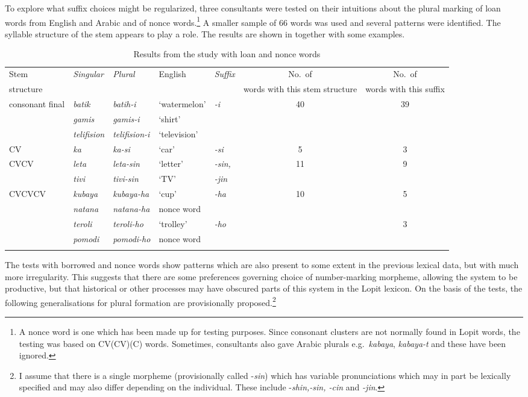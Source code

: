 \documentclass[output=paper]{langsci/langscibook}
\begin{document}
To explore what suffix choices might be regularized, three consultants were tested on their intuitions about the plural marking of loan words from English and Arabic and of nonce words.\footnote{A nonce word is one which has been made up for testing purposes. Since consonant clusters are not normally found in Lopit words, the testing was based on CV(CV)(C) words. Sometimes, consultants also gave Arabic plurals e.g.\ \textit{kabaya}, \textit{kabaya-t} and these have been ignored.} A smaller sample of 66 words was used and several patterns were identified. The syllable structure of the stem appears to play a role. The results are shown in  together with some examples.

\begin{table}
\begin{tabularx}{\textwidth}{X>{\itshape}l>{\itshape}lX>{\itshape}lSS}
\lsptoprule

\small {Stem} & \small \textup{Singular} & \small \textup{Plural} & \small {English} & \small \textup{Suffix} & \small {No.\ of}  & \small {No.\ of} \\ [-.15em]
\small {structure} & & & & & \small {words with this stem structure} & \small {words with this suffix} \\ 
\midrule
 consonant final &  batik &  batih-i &  `water\-melon' &  -i &  40 &  39\\
\tablevspace
&  gamis &  gamis-i &  ‘shirt’ &  &  & \\
\tablevspace
&  telifision &  telifision-i &  ‘television’ &  &  & \\
\midrule
 CV &  ka &  ka-si &  ‘car’ &  -si &  5 &  3\\
\midrule
 CVCV &  leta &  leta-sin &  ‘letter’ & { -sin,}
 &  11 &  9\\
\tablevspace
&  tivi &  tivi-sin &  ‘TV’ &   -jin &  & \\
\midrule
 CVCVCV &  kubaya &  kubaya-ha &  ‘cup’ &  -ha &  10 &  5\\
&  natana &  natana-ha &  nonce word &  &  & \\
\tablevspace
&  teroli &  teroli-ho &  ‘trolley’ &  -ho &  &  3\\
\tablevspace
&  pomodi &  pomodi-ho &  nonce word &  &  & \\
\lspbottomrule
\end{tabularx}
\caption{Results from the study with loan and nonce words}
\label{tab:moodie:13}
\end{table}

The tests with borrowed and nonce words show patterns which are also present to some extent in the previous lexical data, but with much more irregularity. This suggests that there are some preferences governing choice of number-marking morpheme, allowing the system to be productive, but that historical or other processes may have obscured parts of this system in the Lopit lexicon. On the basis of the tests, the following generalisations for plural formation are provisionally proposed.\footnote{I assume that there is a single morpheme (provisionally called -\textit{sin}) which has variable pronunciations which may in part be lexically specified and may also differ depending on the individual. These include -\textit{shin,-sin, -cin }and \textit{-jin}.}
\end{document}

